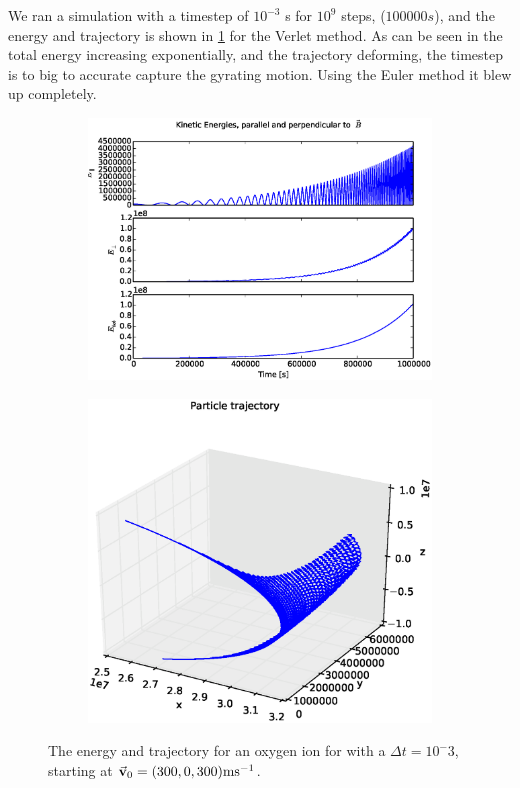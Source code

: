 \documentclass[x11names]{article}
\begin{document}
    We ran a simulation with a timestep of \(10^{-3}\) s for \(10^9\) steps, (\(100000 s\)), and the energy and trajectory is shown in \cref{fig:v_0_prop} for the Verlet method. As can be seen in the total energy increasing exponentially, and the trajectory deforming, the timestep is to big to accurate capture the gyrating motion. Using the Euler method it blew up completely.
    \begin{figure}[ht]
      \begin{subfigure}{0.45\textwidth}
        \includegraphics[width = \textwidth]{../source/figures/ion_9_3_Verletenergy}
      \end{subfigure}
      \begin{subfigure}{0.45\textwidth}
        \includegraphics[width = \textwidth]{../source/figures/ion_9_3_Verlet3Dplot}
      \end{subfigure}
      \caption{The energy and trajectory for an oxygen ion for with a \(\Delta t = 10^-3\), starting at \(\va{v}_0 = (300, 0, 300) \si{ms^{-1} }\).}
      \label{fig:v_0_prop}
    \end{figure}
\end{document}
